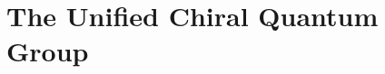 \providecommand{\SCchtop}{\mathsf{SC}^{\mathrm{ch},\mathrm{top}}}
\providecommand{\Ran}{\mathrm{Ran}}
\providecommand{\FM}{\mathrm{FM}}
\providecommand{\MC}{\mathrm{MC}}
\providecommand{\Conf}{\mathrm{Conf}}
\providecommand{\End}{\mathrm{End}}
\providecommand{\Ext}{\mathrm{Ext}}
\providecommand{\Tor}{\mathrm{Tor}}
\providecommand{\Sym}{\mathrm{Sym}}
\providecommand{\Hom}{\mathrm{Hom}}
\providecommand{\Cone}{\operatorname{Cone}}
\providecommand{\Coker}{\operatorname{Coker}}
\providecommand{\Ind}{\operatorname{Ind}}
\providecommand{\Convstr}{\operatorname{Conv}_{\mathrm{str}}}
\providecommand{\cA}{\mathcal{A}}
\providecommand{\cB}{\mathcal{B}}
\providecommand{\cC}{\mathcal{C}}
\providecommand{\cD}{\mathcal{D}}
\providecommand{\cE}{\mathcal{E}}
\providecommand{\cF}{\mathcal{F}}
\providecommand{\cL}{\mathcal{L}}
\providecommand{\cM}{\mathcal{M}}
\providecommand{\cR}{\mathcal{R}}
\providecommand{\cQ}{\mathcal{Q}}
\providecommand{\cT}{\mathcal{T}}
\providecommand{\cW}{\mathcal{W}}
\providecommand{\cZ}{\mathcal{Z}}
\providecommand{\fg}{\mathfrak{g}}
\providecommand{\fh}{\mathfrak{h}}
\providecommand{\fn}{\mathfrak{n}}
\providecommand{\fp}{\mathfrak{p}}
\providecommand{\fb}{\mathfrak{b}}
\providecommand{\fm}{\mathfrak{m}}
\providecommand{\fsl}{\mathfrak{sl}}
\providecommand{\fgl}{\mathfrak{gl}}
\providecommand{\fso}{\mathfrak{so}}
\providecommand{\fsp}{\mathfrak{sp}}
\providecommand{\fosp}{\mathfrak{osp}}
\providecommand{\fkm}{\hat{\mathfrak{g}}}
\providecommand{\Yhbar}{Y_{\hbar}}
\providecommand{\Ysh}{Y^{\mathrm{sh}}}
\providecommand{\Wfin}{W^{\mathrm{fin}}}
\providecommand{\BP}{\mathrm{BP}}
\providecommand{\BFN}{\mathrm{BFN}}
\providecommand{\DS}{\mathrm{DS}}
\providecommand{\chHoch}{\mathrm{ChirHoch}}
\providecommand{\Bord}{\overline{B}^{\,\mathrm{ord}}}
\providecommand{\BSigma}{\overline{B}^{\,\Sigma}}
\providecommand{\GRT}{\mathrm{GRT}_1}
\providecommand{\Ass}{\mathsf{Ass}}
\providecommand{\Lie}{\mathsf{Lie}}
\providecommand{\PBW}{\mathrm{PBW}}
\providecommand{\Res}{\operatorname{Res}}
\providecommand{\Mod}{\mathrm{Mod}}
\providecommand{\id}{\mathrm{id}}
\providecommand{\coll}{\mathrm{coll}}
\providecommand{\ChirAss}{\mathsf{ChirAss}}
\providecommand{\ModFin}{\mathrm{Mod}^{\mathrm{fin}}}
\providecommand{\qdet}{\operatorname{qdet}}
\providecommand{\sgn}{\operatorname{sgn}}

\chapter{The Unified Chiral Quantum Group}
\label{ch:unified-chiral-quantum-group}

